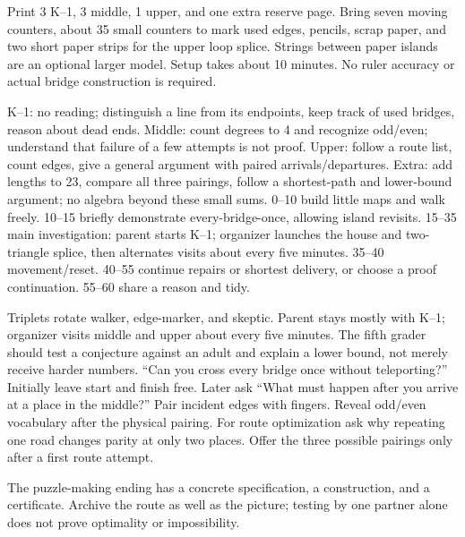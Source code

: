 \documentclass[11pt]{article}
\begin{document}
Print 3 K--1, 3 middle, 1 upper, and one extra reserve page. Bring seven moving counters, about 35 small counters to mark used edges, pencils, scrap paper, and two short paper strips for the upper loop splice. Strings between paper islands are an optional larger model. Setup takes about 10 minutes. No ruler accuracy or actual bridge construction is required.

K--1: no reading; distinguish a line from its endpoints, keep track of used bridges, reason about dead ends. Middle: count degrees to 4 and recognize odd/even; understand that failure of a few attempts is not proof. Upper: follow a route list, count edges, give a general argument with paired arrivals/departures. Extra: add lengths to 23, compare all three pairings, follow a shortest-path and lower-bound argument; no algebra beyond these small sums.
0--10 build little maps and walk freely. 10--15 briefly demonstrate every-bridge-once, allowing island revisits. 15--35 main investigation: parent starts K--1; organizer launches the house and two-triangle splice, then alternates visits about every five minutes. 35--40 movement/reset. 40--55 continue repairs or shortest delivery, or choose a proof continuation. 55--60 share a reason and tidy.

Triplets rotate walker, edge-marker, and skeptic. Parent stays mostly with K--1; organizer visits middle and upper about every five minutes. The fifth grader should test a conjecture against an adult and explain a lower bound, not merely receive harder numbers.
``Can you cross every bridge once without teleporting?'' Initially leave start and finish free. Later ask ``What must happen after you arrive at a place in the middle?'' Pair incident edges with fingers. Reveal odd/even vocabulary after the physical pairing. For route optimization ask why repeating one road changes parity at only two places. Offer the three possible pairings only after a first route attempt.

The puzzle-making ending has a concrete specification, a construction, and a certificate. Archive the route as well as the picture; testing by one partner alone does not prove optimality or impossibility.
\end{document}
